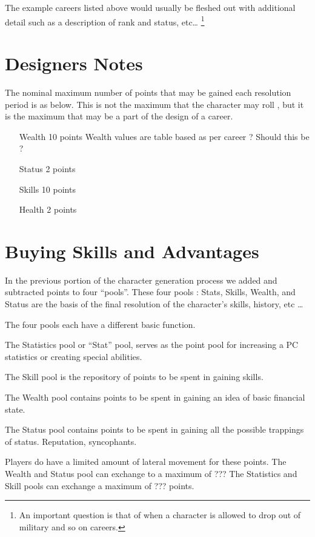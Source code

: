 The example careers listed above would usually be fleshed out with 
additional detail such as a description of rank and status, etc\dots
\footnote{An important question is that of when a character is
allowed to drop out of military and so on careers.}

\section{Designers Notes}

The nominal maximum number of points that may be gained each
resolution period is as below. This is not the maximum that the 
character may roll , but it is the maximum that may be a part of the 
design of a career.

\begin{itemize}
	\item[Wealth] 10 points
	Wealth values are table based as per career ? Should this be ?
	\item[Status] 2 points
	\item[Skills] 10 points
	\item[Health] 2 points
\end{itemize}

\section{Buying Skills and Advantages}

In the previous portion of the character generation process we added 
and subtracted points to four ``pools''. These four pools : Stats, 
Skills, Wealth, and Status are the basis of the final resolution of 
the character's skills, history, etc \dots

The four pools each have a different basic function.

The Statistics pool or ``Stat'' pool, serves as the point pool for 
increasing a PC statistics or creating special abilities.

The Skill pool is the repository of points to be spent in gaining 
skills.

The Wealth pool contains points to be spent in gaining an idea of 
basic financial state.

The Status pool contains points to be spent in gaining all the 
possible trappings of status. Reputation, syncophants.

Players do have a limited amount of lateral movement for these 
points. The Wealth and Status pool can exchange to a maximum of ???
The Statistics and Skill pools can exchange a maximum of ???
points.

